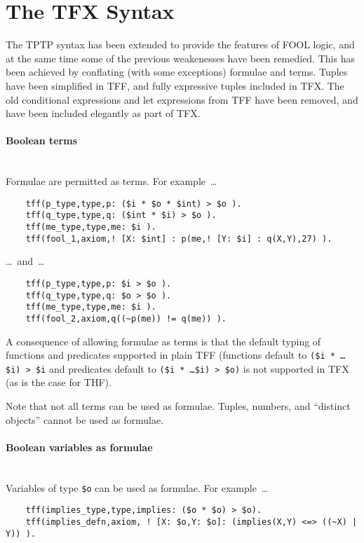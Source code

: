 \documentclass{easychair}
\begin{document}
\section{The TFX Syntax}
\label{TFX}

The TPTP syntax has been extended to provide the features of FOOL logic,
and at the same time some of the previous weakenesses have been remedied.
This has been achieved by conflating (with some exceptions) formulae and 
terms. 
Tuples have been simplified in TFF, and fully expressive tuples included in 
TFX. 
The old conditional expressions and let expressions from TFF have been 
removed, and have been included elegantly as part of TFX. 

\paragraph{Boolean terms}~\\
Formulae are permitted as terms. For example~\ldots
\begin{verbatim}
    tff(p_type,type,p: ($i * $o * $int) > $o ).
    tff(q_type,type,q: ($int * $i) > $o ).
    tff(me_type,type,me: $i ).
    tff(fool_1,axiom,! [X: $int] : p(me,! [Y: $i] : q(X,Y),27) ).
\end{verbatim}
\ldots~and~\ldots
\begin{verbatim}
    tff(p_type,type,p: $i > $o ).
    tff(q_type,type,q: $o > $o ).
    tff(me_type,type,me: $i ).
    tff(fool_2,axiom,q((~p(me)) != q(me)) ).
\end{verbatim}
A consequence of allowing formulae as terms is that the default typing of 
functions and predicates supported in plain TFF (functions default to 
{\tt (\$i * \ldots * \$i) > \$i} and predicates default to 
{\tt (\$i * \ldots * \$i) > \$o)} is not supported in TFX (as is the case 
for THF).

Note that not all terms can be used as formulae.
Tuples, numbers, and ``distinct objects'' cannot be used as formulae.

\paragraph{Boolean variables as formulae}~\\
Variables of type {\tt \$o} can be used as formulae. For example~\ldots
\begin{verbatim}
    tff(implies_type,type,implies: ($o * $o) > $o).
    tff(implies_defn,axiom, ! [X: $o,Y: $o]: (implies(X,Y) <=> ((~X) | Y)) ).
\end{verbatim}
\end{document}
